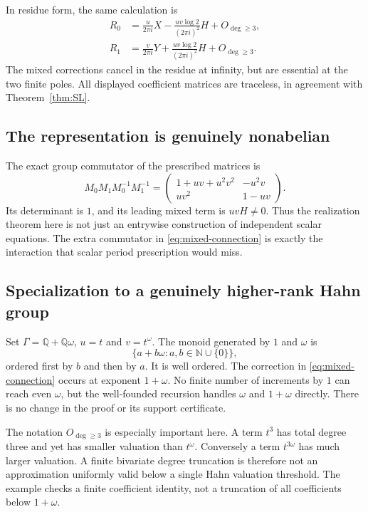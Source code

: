 \documentclass[11pt,letterpaper]{article}
\numberwithin{equation}{section}
\theoremstyle{definition}
\theoremstyle{remark}
\newcommand{\Q}{\mathbb Q}
\newcommand{\N}{\mathbb N}
\begin{document}
In residue form, the same calculation is
\begin{align}
 R_0&=\frac{u}{2\pi i}X
      -\frac{uv\log 2}{(2\pi i)^2}H+O_{\deg\geq3},\label{eq:R0}\\
 R_1&=\frac{v}{2\pi i}Y
      +\frac{uv\log 2}{(2\pi i)^2}H+O_{\deg\geq3}.\label{eq:R1}
\end{align}
The mixed corrections cancel in the residue at infinity, but are essential
at the two finite poles. All displayed coefficient matrices are traceless,
in agreement with Theorem~\ref{thm:SL}.

\subsection{The representation is genuinely nonabelian}
The exact group commutator of the prescribed matrices is
\begin{equation}\label{eq:commutator}
 M_0M_1M_0^{-1}M_1^{-1}
 =\begin{pmatrix}
  1+uv+u^2v^2&-u^2v\\
  uv^2&1-uv
 \end{pmatrix}.
\end{equation}
Its determinant is $1$, and its leading mixed term is $uvH\ne0$.
Thus the realization theorem here is not just an entrywise construction of
independent scalar equations. The extra commutator in
\eqref{eq:mixed-connection} is exactly the interaction that scalar period
prescription would miss.

\subsection{Specialization to a genuinely higher-rank Hahn group}
Set $\Gamma=\Q+\Q\omega$, $u=t$ and $v=t^\omega$. The monoid generated by
$1$ and $\omega$ is
\[
 \{a+b\omega:a,b\in\N\cup\{0\}\},
\]
ordered first by $b$ and then by $a$. It is well ordered. The correction in
\eqref{eq:mixed-connection} occurs at exponent $1+\omega$.
No finite number of increments by $1$ can reach even $\omega$, but the
well-founded recursion handles $\omega$ and $1+\omega$ directly. There is
no change in the proof or its support certificate.

The notation $O_{\deg\geq3}$ is especially important here. A term $t^3$
has total degree three and yet has smaller valuation than $t^\omega$.
Conversely a term $t^{3\omega}$ has much larger valuation. A finite
bivariate degree truncation is therefore not an approximation uniformly
valid below a single Hahn valuation threshold. The example checks a finite
coefficient identity, not a truncation of all coefficients below
$1+\omega$.
\end{document}
